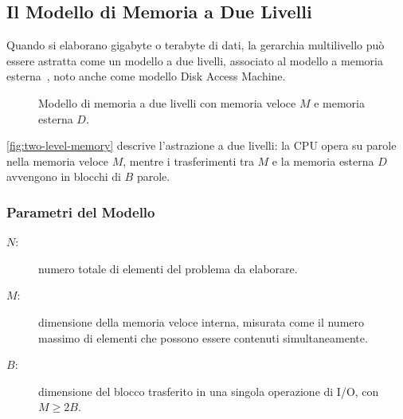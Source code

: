 \FloatBarrier
\subsection{Il Modello di Memoria a Due Livelli}

Quando si elaborano gigabyte o terabyte di dati, la gerarchia multilivello può essere astratta come un modello a due livelli, associato al modello a memoria esterna~\cite{aggarwal1988}, noto anche come modello Disk Access Machine.

\begin{figure}[H]
  \centering
  \caption{Modello di memoria a due livelli con memoria veloce $M$ e memoria esterna $D$.}
  \label{fig:two-level-memory}
\end{figure}

\autoref{fig:two-level-memory} descrive l'astrazione a due livelli: la CPU opera su parole nella memoria veloce $M$, mentre i trasferimenti tra $M$ e la memoria esterna $D$ avvengono in blocchi di $B$ parole.

\subsubsection{Parametri del Modello}

\begin{description}
  \item[$N$:] numero totale di elementi del problema da elaborare.
  \item[$M$:] dimensione della memoria veloce interna, misurata come il numero massimo di elementi che possono essere contenuti simultaneamente.
  \item[$B$:] dimensione del blocco trasferito in una singola operazione di I/O, con $M \geq 2B$.
\end{description}

